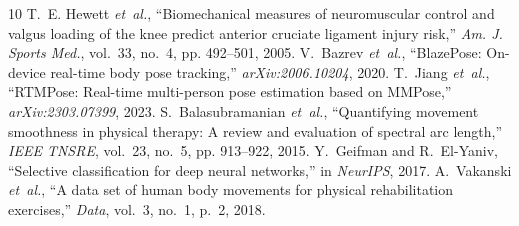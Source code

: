 \documentclass[10pt,journal,compsoc]{IEEEtran}
\begin{document}

\begin{thebibliography}{10}
T.~E. Hewett \emph{et~al.}, ``Biomechanical measures of neuromuscular control and valgus loading of the knee predict anterior cruciate ligament injury risk,'' \emph{Am. J. Sports Med.}, vol.~33, no.~4, pp. 492--501, 2005.
V.~Bazrev \emph{et~al.}, ``BlazePose: On-device real-time body pose tracking,'' \emph{arXiv:2006.10204}, 2020.
T.~Jiang \emph{et~al.}, ``RTMPose: Real-time multi-person pose estimation based on MMPose,'' \emph{arXiv:2303.07399}, 2023.
S.~Balasubramanian \emph{et~al.}, ``Quantifying movement smoothness in physical therapy: A review and evaluation of spectral arc length,'' \emph{IEEE TNSRE}, vol.~23, no.~5, pp. 913--922, 2015.
Y.~Geifman and R.~El-Yaniv, ``Selective classification for deep neural networks,'' in \emph{NeurIPS}, 2017.
A.~Vakanski \emph{et~al.}, ``A data set of human body movements for physical rehabilitation exercises,'' \emph{Data}, vol.~3, no.~1, p.~2, 2018.
\end{thebibliography}
\end{document}
